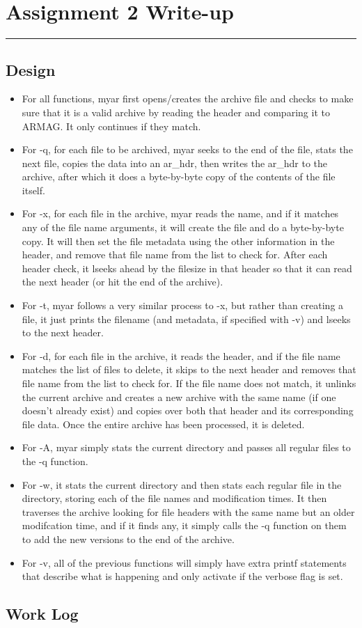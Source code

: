 \documentclass[letterpaper,10pt,fleqn]{article}
\numberwithin{equation}{section}
\begin{document}

\section*{Assignment 2 Write-up}
\hrule

\subsection*{Design}
\begin{itemize}
        \item For all functions, myar first opens/creates the archive file and checks to make sure that it is a valid archive by reading the header and comparing it to ARMAG.  It only continues if they match.
        \item For -q, for each file to be archived, myar seeks to the end of the file, stats the next file, copies the data into an ar\_hdr, then writes the ar\_hdr to the archive, after which it does a byte-by-byte copy of the contents of the file itself.
        \item For -x, for each file in the archive, myar reads the name, and if it matches any of the file name arguments, it will create the file and do a byte-by-byte copy.  It will then set the file metadata using the other information in the header, and remove that file name from the list to check for.  After each header check, it lseeks ahead by the filesize in that header so that it can read the next header (or hit the end of the archive).
        \item For -t, myar follows a very similar process to -x, but rather than creating a file, it just prints the filename (and metadata, if specified with -v) and lseeks to the next header.
        \item For -d, for each file in the archive, it reads the header, and if the file name matches the list of files to delete, it skips to the next header and removes that file name from the list to check for.  If the file name does not match, it unlinks the current archive and creates a new archive with the same name (if one doesn't already exist) and copies over both that header and its corresponding file data.  Once the entire archive has been processed, it is deleted.
        \item For -A, myar simply stats the current directory and passes all regular files to the -q function.
        \item For -w, it stats the current directory and then stats each regular file in the directory, storing each of the file names and modification times.  It then traverses the archive looking for file headers with the same name but an older modifcation time, and if it finds any, it simply calls the -q function on them to add the new versions to the end of the archive.
        \item For -v, all of the previous functions will simply have extra printf statements that describe what is happening and only activate if the verbose flag is set.
\end{itemize}

\subsection*{Work Log}
\end{document}
